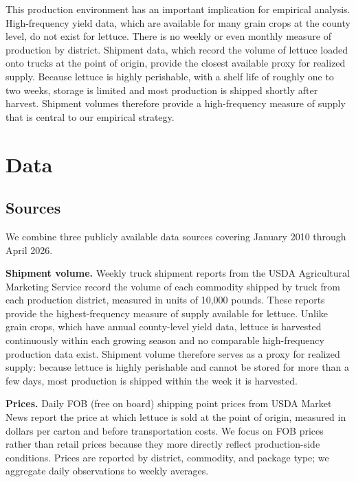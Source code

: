 \documentclass[12pt]{article}
\begin{document}
This production environment has an important implication for empirical analysis. High-frequency yield data, which are available for many grain crops at the county level, do not exist for lettuce. There is no weekly or even monthly measure of production by district. Shipment data, which record the volume of lettuce loaded onto trucks at the point of origin, provide the closest available proxy for realized supply. Because lettuce is highly perishable, with a shelf life of roughly one to two weeks, storage is limited and most production is shipped shortly after harvest. Shipment volumes therefore provide a high-frequency measure of supply that is central to our empirical strategy.

\section{Data}
\label{sec:data}

\subsection{Sources}
\label{subsec:sources}

We combine three publicly available data sources covering January 2010 through April 2026.

\textbf{Shipment volume.} Weekly truck shipment reports from the USDA Agricultural Marketing Service \citep{usda_ams_truck} record the volume of each commodity shipped by truck from each production district, measured in units of 10,000 pounds. These reports provide the highest-frequency measure of supply available for lettuce. Unlike grain crops, which have annual county-level yield data, lettuce is harvested continuously within each growing season and no comparable high-frequency production data exist. Shipment volume therefore serves as a proxy for realized supply: because lettuce is highly perishable and cannot be stored for more than a few days, most production is shipped within the week it is harvested.

\textbf{Prices.} Daily FOB (free on board) shipping point prices from USDA Market News \citep{usda_market_news} report the price at which lettuce is sold at the point of origin, measured in dollars per carton and before transportation costs. We focus on FOB prices rather than retail prices because they more directly reflect production-side conditions. Prices are reported by district, commodity, and package type; we aggregate daily observations to weekly averages.
\end{document}
